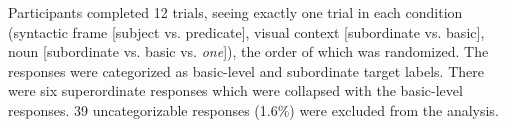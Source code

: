 \documentclass[10pt,letterpaper]{article}
\newcommand{\mht}[1]{\textcolor{Blue}{[mht: #1]}}
\begin{document}
Participants completed 12 trials, seeing exactly one trial in each condition (syntactic frame [subject vs. predicate], visual context [subordinate vs. basic], noun [subordinate vs. basic vs. \emph{one}]), the order of which was randomized.
The responses were categorized as basic-level and subordinate target labels. There were six superordinate responses which were collapsed with the basic-level responses. 39 uncategorizable responses (1.6\%) were excluded from the analysis. 
\end{document}
